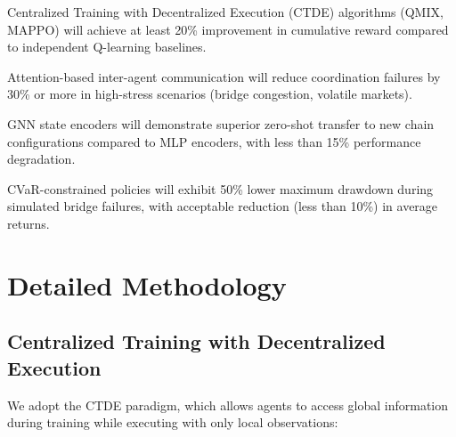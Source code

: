 \documentclass[11pt,a4paper]{article}
\begin{document}
\begin{hypothesis}
Centralized Training with Decentralized Execution (CTDE) algorithms (QMIX, MAPPO) will achieve at least 20\% improvement in cumulative reward compared to independent Q-learning baselines.
\end{hypothesis}

\begin{hypothesis}
Attention-based inter-agent communication will reduce coordination failures by 30\% or more in high-stress scenarios (bridge congestion, volatile markets).
\end{hypothesis}

\begin{hypothesis}
GNN state encoders will demonstrate superior zero-shot transfer to new chain configurations compared to MLP encoders, with less than 15\% performance degradation.
\end{hypothesis}

\begin{hypothesis}
CVaR-constrained policies will exhibit 50\% lower maximum drawdown during simulated bridge failures, with acceptable reduction (less than 10\%) in average returns.
\end{hypothesis}

\section{Detailed Methodology}\label{sec:methods}

\subsection{Centralized Training with Decentralized Execution}

We adopt the CTDE paradigm, which allows agents to access global information during training while executing with only local observations:
\end{document}
